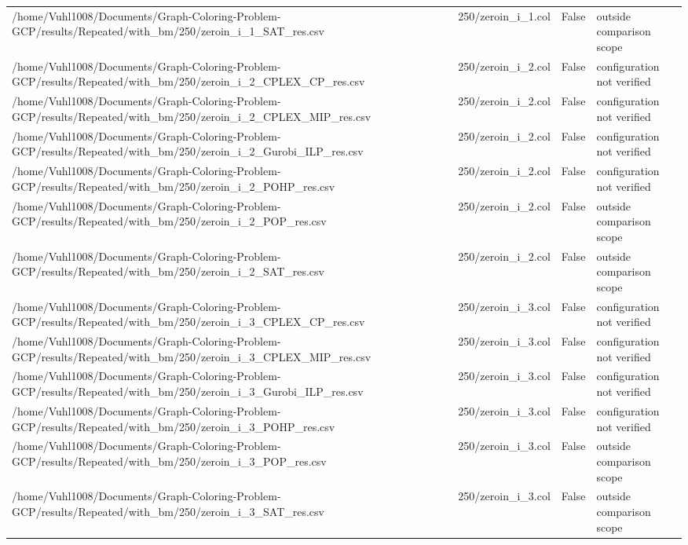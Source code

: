 \begin{table}[htbp]
\begin{tabular}{llll}
/home/Vuhl1008/Documents/Graph-Coloring-Problem-GCP/results/Repeated/with\_bm/250/zeroin\_i\_1\_SAT\_res.csv & 250/zeroin\_i\_1.col & False & outside comparison scope \\
/home/Vuhl1008/Documents/Graph-Coloring-Problem-GCP/results/Repeated/with\_bm/250/zeroin\_i\_2\_CPLEX\_CP\_res.csv & 250/zeroin\_i\_2.col & False & configuration not verified \\
/home/Vuhl1008/Documents/Graph-Coloring-Problem-GCP/results/Repeated/with\_bm/250/zeroin\_i\_2\_CPLEX\_MIP\_res.csv & 250/zeroin\_i\_2.col & False & configuration not verified \\
/home/Vuhl1008/Documents/Graph-Coloring-Problem-GCP/results/Repeated/with\_bm/250/zeroin\_i\_2\_Gurobi\_ILP\_res.csv & 250/zeroin\_i\_2.col & False & configuration not verified \\
/home/Vuhl1008/Documents/Graph-Coloring-Problem-GCP/results/Repeated/with\_bm/250/zeroin\_i\_2\_POHP\_res.csv & 250/zeroin\_i\_2.col & False & configuration not verified \\
/home/Vuhl1008/Documents/Graph-Coloring-Problem-GCP/results/Repeated/with\_bm/250/zeroin\_i\_2\_POP\_res.csv & 250/zeroin\_i\_2.col & False & outside comparison scope \\
/home/Vuhl1008/Documents/Graph-Coloring-Problem-GCP/results/Repeated/with\_bm/250/zeroin\_i\_2\_SAT\_res.csv & 250/zeroin\_i\_2.col & False & outside comparison scope \\
/home/Vuhl1008/Documents/Graph-Coloring-Problem-GCP/results/Repeated/with\_bm/250/zeroin\_i\_3\_CPLEX\_CP\_res.csv & 250/zeroin\_i\_3.col & False & configuration not verified \\
/home/Vuhl1008/Documents/Graph-Coloring-Problem-GCP/results/Repeated/with\_bm/250/zeroin\_i\_3\_CPLEX\_MIP\_res.csv & 250/zeroin\_i\_3.col & False & configuration not verified \\
/home/Vuhl1008/Documents/Graph-Coloring-Problem-GCP/results/Repeated/with\_bm/250/zeroin\_i\_3\_Gurobi\_ILP\_res.csv & 250/zeroin\_i\_3.col & False & configuration not verified \\
/home/Vuhl1008/Documents/Graph-Coloring-Problem-GCP/results/Repeated/with\_bm/250/zeroin\_i\_3\_POHP\_res.csv & 250/zeroin\_i\_3.col & False & configuration not verified \\
/home/Vuhl1008/Documents/Graph-Coloring-Problem-GCP/results/Repeated/with\_bm/250/zeroin\_i\_3\_POP\_res.csv & 250/zeroin\_i\_3.col & False & outside comparison scope \\
/home/Vuhl1008/Documents/Graph-Coloring-Problem-GCP/results/Repeated/with\_bm/250/zeroin\_i\_3\_SAT\_res.csv & 250/zeroin\_i\_3.col & False & outside comparison scope \\

\end{tabular}
\end{table}
